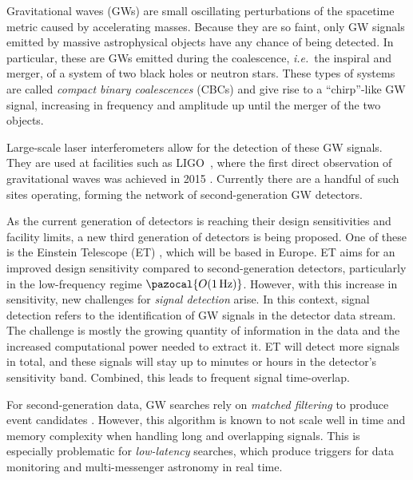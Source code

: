 
Gravitational waves (GWs) are small oscillating perturbations of the spacetime metric caused by accelerating masses.
Because they are so faint, only GW signals emitted by massive astrophysical objects have any chance of being detected. 
In particular, these are GWs emitted during the coalescence, \emph{i.e.}\ the inspiral and merger, of a system of two black holes or neutron stars. These types of systems are called \emph{compact binary coalescences} (CBCs) and give rise to a \enquote{chirp}-like GW signal, increasing in frequency and amplitude up until the merger of the two objects.

Large-scale laser interferometers allow for the detection of these GW signals. They are used at facilities such as LIGO~\cite{Abbott_2009, Aasi_2015}, where the first direct observation of gravitational waves was achieved in 2015 \cite{PhysRevLett.116.061102}. Currently there are a handful of such sites operating, forming the network of second-generation GW detectors.

As the current generation of detectors is reaching their design sensitivities and facility limits, a new third generation of detectors is being proposed.
One of these is the Einstein Telescope (ET) \cite{Punturo_2010, Hild_2011}, which will be based in Europe.
ET aims for an improved design sensitivity compared to second-generation detectors, particularly in the low-frequency regime $\pazocal{O(\SI{1}{\hertz})}$.  
However, with this increase in sensitivity, new challenges for \emph{signal detection} arise. In this context, signal detection refers to the identification of GW signals in the detector data stream. 
The challenge is mostly the growing quantity of information in the data and the increased computational power needed to extract it. ET will detect more signals in total, and these signals will stay up to minutes or hours in the detector's sensitivity band. Combined, this leads to frequent signal time-overlap.


For second-generation data, GW searches rely on \emph{matched filtering} to produce event candidates \cite{PhysRevD.85.122006, Usman_2016}. 
However, this algorithm is known to not scale well in time and memory complexity when handling long and overlapping signals. This is especially problematic for \emph{low-latency} searches, which produce triggers for data monitoring and multi-messenger astronomy in real time. 	

